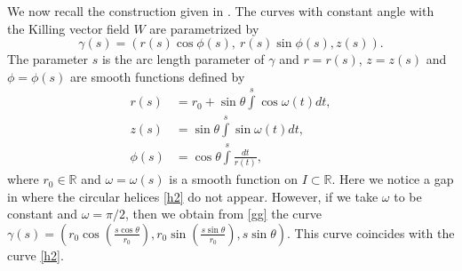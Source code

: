 \documentclass[a4paper,12pt]{amsart}
\theoremstyle{definition}
\def\r{\mathbb R}
\begin{document}
We now recall the construction given in \cite{mn}. The curves with constant angle with the Killing vector field $W$ are parametrized by   
\begin{equation}\label{gg} 
\gamma(s)=\left(r(s)\cos\phi(s),\ r(s)\sin\phi(s),z(s)\right).
\end{equation}
 The parameter $s$ is the arc length parameter of $\gamma$ and $r=r(s)$, $z=z(s)$ and $\phi=\phi(s)$   are smooth  functions  defined by  
\begin{equation*}
\begin{split}
r(s)&=r_0+\sin\theta\int\limits^s \cos\omega(t) dt,\\
 z(s)&=\sin\theta\int\limits^s \sin\omega(t) dt,\\
\phi(s)&=\cos\theta\int\limits^s\frac{dt}{r(t)},
\end{split}
\end{equation*}
where $r_0\in{\mathbb{R}}$ and $\omega=\omega(s)$ is a smooth function on $I\subset\r$. Here we notice a gap in \cite{mn} where the circular helices \eqref{h2} do not appear. However, if we take $\omega$ to be constant and   $\omega=\pi/2$, then we obtain from \eqref{gg} the curve $\gamma(s)=(r_0 \cos \left(\frac{s\cos\theta}{r_0}\right),r_0 \sin \left(\frac{s\sin\theta}{r_0}\right),s \sin \theta )$. This curve coincides with  the curve \eqref{h2}.
\end{document}
